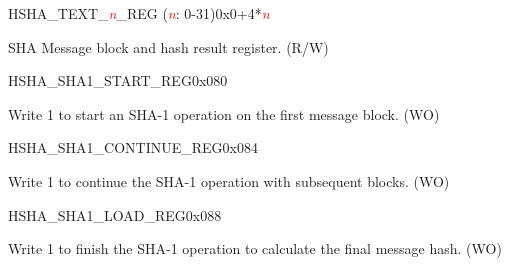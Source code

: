 \begin{register}{H}{SHA\_TEXT\_\textit{\textcolor{red}{\it{n}}}\_REG (\textcolor{red}{\it{n}}: 0-31)}{0x0+4*\textcolor{red}{\it{n}}}\label{regdesc:SHATEXTnREG}
%
\regnewline%
\begin{regdesc}\begin{reglist}
\item [SHA\_TEXT\_\textit{\textcolor{red}{\it{n}}}\_REG (\textcolor{red}{\it{n}}: 0-31)]SHA Message block and hash result register. (R/W)
\end{reglist}\end{regdesc}
\end{register}


\begin{register}{H}{SHA\_SHA1\_START\_REG}{0x080}\label{regdesc:SHASHA1STARTREG}
%
%
\regnewline%
\begin{regdesc}\begin{reglist}
\item [SHA\_SHA1\_START]Write 1 to start an SHA-1 operation on the first message block. (WO)
\end{reglist}\end{regdesc}
\end{register}


\begin{register}{H}{SHA\_SHA1\_CONTINUE\_REG}{0x084}\label{regdesc:SHASHA1CONTINUEREG}
%
%
\regnewline%
\begin{regdesc}\begin{reglist}
\item [SHA\_SHA1\_CONTINUE]Write 1 to continue the SHA-1 operation with subsequent blocks. (WO)
\end{reglist}\end{regdesc}
\end{register}


\begin{register}{H}{SHA\_SHA1\_LOAD\_REG}{0x088}\label{regdesc:SHASHA1LOADREG}
%
%
\regnewline%
\begin{regdesc}\begin{reglist}
\item [SHA\_SHA1\_LOAD]Write 1 to finish the SHA-1 operation to calculate the final message hash. (WO)
\end{reglist}\end{regdesc}
\end{register}


